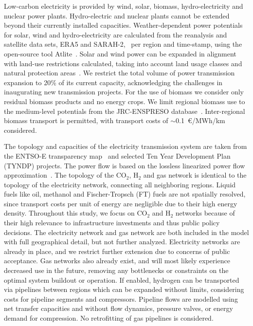 \documentclass[twocolumn]{article}
\newcommand{\carbon}{CO$_2$}
\newcommand{\hydrogen}{H$_2$}
\begin{document}

Low-carbon electricity is provided by wind, solar, biomass, hydro-electricity and nuclear power plants. Hydro-electric and nuclear plants cannot be extended beyond their currently installed capacities. Weather-dependent power potentials for solar, wind and hydro-electricity are calculated from the reanalysis and satellite data sets, ERA5 and SARAH-2,~\cite{hersbachERA5GlobalReanalysis2020,pfeifrothSurfaceRadiationData2017} per region and time-stamp, using the open-source tool Atlite~\cite{hofmannAtliteLightweightPython2021}.
Solar and wind power can be expanded in alignment with land-use restrictions calculated, taking into account land usage classes and natural protection areas~\cite{eeaCorineLandCover2012,eeaNatura2000Data2016}. We restrict the total volume of power transmission expansion to 20\% of its current capacity, acknowledging the challenges in inaugurating new transmission projects.
For the use of biomass we consider only residual biomass products and no energy crops. We limit regional biomass use to the medium-level potentials from the JRC-ENSPRESO database~\cite{enspreso_database,instituteforenergyandtransportjointresearchcentreJRCEUTIMESModelBioenergy2015}. Inter-regional biomass transport is permitted, with transport costs of $\sim$0.1~€/MWh/km considered.


The topology and capacities of the electricity transmission system are taken from the ENTSO-E transparency map~\cite{wiegmansGridkitExtractEntsoE2016} and selected Ten Year Development Plan (TYNDP) projects. The power flow is based on the lossless linearized power flow approximation~.
The topology of the \carbon{}, \hydrogen{} and gas network is identical to the topology of the electricity network, connecting all neighboring regions. Liquid fuels like oil, methanol and Fischer-Tropsch (FT) fuels are not spatially resolved, since transport costs per unit of energy are negligible due to their high energy density. Throughout this study, we focus on \carbon{} and \hydrogen{} networks because of their high relevance to infrastructure investments and thus public policy decisions. The electricity network and gas network are both included in the model with full geographical detail, but not further analyzed. Electricity networks are already in place, and we restrict further extension due to concerns of public acceptance. Gas networks also already exist, and will most likely experience decreased use in the future, removing any bottlenecks or constraints on the optimal system buildout or operation.
If enabled, hydrogen can be transported via pipelines between regions which can be expanded without limits, considering costs for pipeline segments and compressors. Pipeline flows are modelled using net transfer capacities and without flow dynamics, pressure valves, or energy demand for compression. No retrofitting of gas pipelines is considered.
\end{document}
